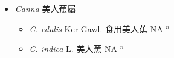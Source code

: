 
  \begin{itemize}
 \item[] \textit{Canna} 美人蕉屬
                    
  \begin{itemize}
        \item[] \href{http://www.theplantlist.org/tpl1.1/search?q=Canna+edulis}{\textit{C. edulis} Ker Gawl.}   食用美人蕉 NA $^n$
        \item[] \href{http://www.theplantlist.org/tpl1.1/search?q=Canna+indica}{\textit{C. indica} L.}   美人蕉 NA $^n$
  \end{itemize}
  \end{itemize}
